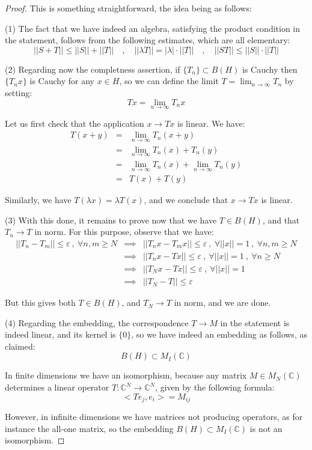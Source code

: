 \documentclass[12pt]{amsbook}
\begin{document}
\begin{proof}
This is something straightforward, the idea being as follows:

\medskip

(1) The fact that we have indeed an algebra, satisfying the product condition in the statement, follows from the following estimates, which are all elementary:
$$||S+T||\leq||S||+||T||\quad,\quad 
||\lambda T||=|\lambda|\cdot||T||\quad,\quad 
||ST||\leq||S||\cdot||T||$$

(2) Regarding now the completness assertion, if $\{T_n\}\subset B(H)$ is Cauchy then $\{T_nx\}$ is Cauchy for any $x\in H$, so we can define the limit $T=\lim_{n\to\infty}T_n$ by setting:
$$Tx=\lim_{n\to\infty}T_nx$$

Let us first check that the application $x\to Tx$ is linear. We have:
\begin{eqnarray*}
T(x+y)
&=&\lim_{n\to\infty}T_n(x+y)\\
&=&\lim_{n\to\infty}T_n(x)+T_n(y)\\
&=&\lim_{n\to\infty}T_n(x)+\lim_{n\to\infty}T_n(y)\\
&=&T(x)+T(y)
\end{eqnarray*}

Similarly, we have $T(\lambda x)=\lambda T(x)$, and we conclude that $x\to Tx$ is linear.

\medskip

(3) With this done, it remains to prove now that we have $T\in B(H)$, and that $T_n\to T$ in norm. For this purpose, observe that we have:
\begin{eqnarray*}
||T_n-T_m||\leq\varepsilon\ ,\ \forall n,m\geq N
&\implies&||T_nx-T_mx||\leq\varepsilon\ ,\ \forall||x||=1\ ,\ \forall n,m\geq N\\
&\implies&||T_nx-Tx||\leq\varepsilon\ ,\ \forall||x||=1\ ,\ \forall n\geq N\\
&\implies&||T_Nx-Tx||\leq\varepsilon\ ,\ \forall||x||=1\\
&\implies&||T_N-T||\leq\varepsilon
\end{eqnarray*}

But this gives both $T\in B(H)$, and $T_N\to T$ in norm, and we are done.

\medskip

(4) Regarding the embedding, the correspondence $T\to M$ in the statement is indeed linear, and its kernel is $\{0\}$, so we have indeed an embedding as follows, as claimed:
$$B(H)\subset M_I(\mathbb C)$$

In finite dimensions we have an isomorphism, because any matrix $M\in M_N(\mathbb C)$ determines a linear operator $T:\mathbb C^N\to\mathbb C^N$, given by the following formula:
$$<Te_j,e_i>=M_{ij}$$

However, in infinite dimensions we have matrices not producing operators, as for instance the all-one matrix, so the embedding $B(H)\subset M_I(\mathbb C)$ is not an isomorphism.
\end{proof}
\end{document}
